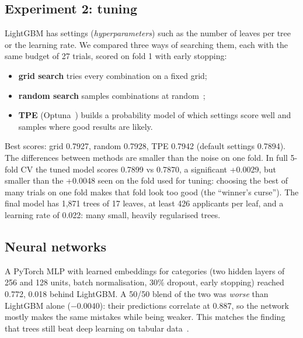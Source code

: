 \documentclass[conference,10pt]{IEEEtran}
\begin{document}
\subsection{Experiment 2: tuning}
LightGBM has settings (\emph{hyperparameters}) such as the number of leaves per tree or the
learning rate. We compared three ways of searching them, each with the same budget of 27 trials,
scored on fold 1 with early stopping:
\begin{itemize}
\item \textbf{grid search} tries every combination on a fixed grid;
\item \textbf{random search} samples combinations at random~\cite{bergstra2012};
\item \textbf{TPE} (Optuna~\cite{akiba2019,bergstra2011}) builds a probability model of which
settings score well and samples where good results are likely.
\end{itemize}
Best scores: grid 0.7927, random 0.7928, TPE 0.7942 (default settings 0.7894). The differences
between methods are smaller than the noise on one fold. In full 5-fold CV the tuned model scores
0.7899 vs 0.7870, a significant +0.0029, but smaller than the +0.0048 seen on the fold used for
tuning: choosing the best of many trials on one fold makes that fold look too good (the
``winner's curse''). The final model has 1,871 trees of 17 leaves, at least 426 applicants per
leaf, and a learning rate of 0.022: many small, heavily regularised trees.

\subsection{Neural networks}
A PyTorch MLP with learned embeddings for categories (two hidden layers of 256 and 128 units,
batch normalisation, 30\% dropout, early stopping) reached 0.772, 0.018 behind LightGBM. A 50/50
blend of the two was \emph{worse} than LightGBM alone ($-0.0040$): their predictions correlate
at 0.887, so the network mostly makes the same mistakes while being weaker. This matches the
finding that trees still beat deep learning on tabular data~\cite{grinsztajn2022}.
\end{document}
